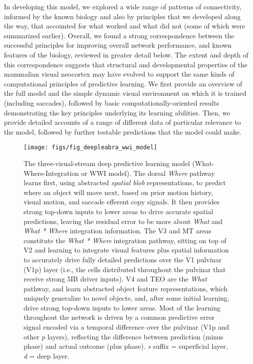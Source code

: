 \documentclass[11pt,twoside]{article}
\newif\myifpdf
\begin{document}
In developing this model, we explored a wide range of patterns of connectivity, informed by the known biology and also by principles that we developed along the way, that accounted for what worked and what did not (some of which were summarized earlier).  Overall, we found a strong correspondence between the successful principles for improving overall network performance, and known features of the biology, reviewed in greater detail below.  The extent and depth of this correspondence suggests that structural and developmental properties of the mammalian visual neocortex may have evolved to support the same kinds of computational principles of predictive learning.  We first provide an overview of the full model and the simple dynamic visual environment on which it is trained (including saccades), followed by basic computationally-oriented results demonstrating the key principles underlying its learning abilities.  Then, we provide detailed accounts of a range of different data of particular relevance to the model, followed by further testable predictions that the model could make.

\begin{figure}
  \centering\texttt{[image: figs/fig\_deepleabra\_wwi\_model]}
  \caption{\footnotesize The three-visual-stream deep predictive learning model (What-Where-Integration or WWI model). The dorsal {\em Where} pathway learns first, using abstracted {\em spatial blob} representations, to predict where an object will move next, based on prior motion history, visual motion, and saccade efferent copy signals.  It then provides strong top-down inputs to lower areas to drive accurate spatial predictions, leaving the residual error to be more about {\em What} and {\em What * Where} integration information.  The V3 and MT areas constitute the {\em What * Where} integration pathway, sitting on top of V2 and learning to integrate visual features plus spatial information to accurately drive fully detailed predictions over the V1 pulvinar (V1p) layer (i.e., the cells distributed throughout the pulvinar that receive strong 5IB driver inputs).  V4 and TEO are the {\em What} pathway, and learn abstracted object feature representations, which uniquely generalize to novel objects, and, after some initial learning, drive strong top-down inputs to lower areas.  Most of the learning throughout the network is driven by a common predictive error signal encoded via a temporal difference over the pulvinar (V1p and other {\em p} layers), reflecting the difference between prediction (minus phase) and actual outcome (plus phase). {\em s} suffix = superficial  layer, {\em d} = deep layer.}
  \label{fig.wwi_model}
\end{figure}
\end{document}

